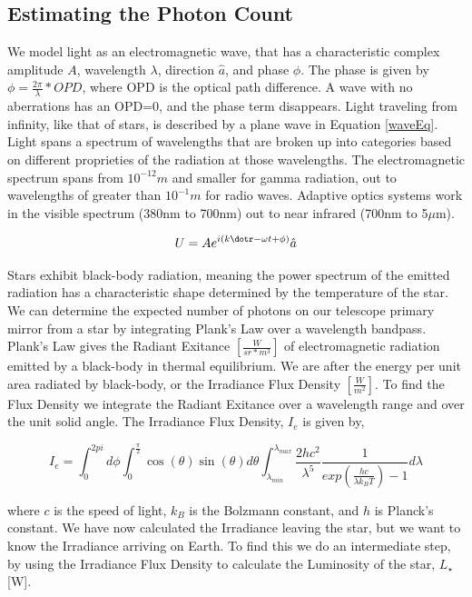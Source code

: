 \subsection{Estimating the Photon Count}

We model light as an electromagnetic wave, that has a characteristic complex amplitude $A$, wavelength $\lambda$, direction $\hat{a}$, and phase $\phi$. The phase is given by $\phi= \frac{2\pi}{\lambda}*OPD$, where OPD is the optical path difference. A wave with no aberrations has an OPD=0, and the phase term disappears. Light traveling from infinity, like that of stars, is described by a plane wave in Equation \ref{waveEq}. Light spans a spectrum of wavelengths that are broken up into categories based on different proprieties of the radiation at those wavelengths. The electromagnetic spectrum spans from $10^{-12} m$ and smaller for gamma radiation, out to wavelengths of greater than $10^{-1} m$ for radio waves. Adaptive optics systems work in the visible spectrum (380nm to 700nm) out to near infrared (700nm to 5$\mu$m). 

\begin{equation}
    U=Ae^{i(k\dotr-\omega t+ \phi)}\hat{a}
    \label{waveEq}
\end{equation}

Stars exhibit black-body radiation, meaning the power spectrum of the emitted radiation has a characteristic shape determined by the temperature of the star. We can determine the expected number of photons on our telescope primary mirror from a star by integrating Plank's Law over a wavelength bandpass. Plank's Law gives the Radiant Exitance $[\frac{W}{sr*m^3}]$ of electromagnetic radiation emitted by a black-body in thermal equilibrium. We are after the energy per unit area radiated by black-body, or the Irradiance Flux Density $[\frac{W}{m^2}]$. To find the Flux Density we integrate the Radiant Exitance over a wavelength range and over the unit solid angle. The Irradiance Flux Density, $I_e$ is given by,

\begin{equation}
    I_e=\int_{0}^{2pi} d\phi \int_{0}^{\frac{\pi}{2}} \cos(\theta)\sin(\theta)d\theta \int_{\lambda_{min}}^{\lambda_{max}} \frac{2hc^2}{\lambda^5}\frac{1}{exp(\frac{hc}{\lambda k_B T})-1} d\lambda
\end{equation}

where $c$ is the speed of light, $k_B$ is the Bolzmann constant, and $h$ is Planck's constant. We have now calculated the Irradiance leaving the star, but we want to know the Irradiance arriving on Earth. To find this we do an intermediate step, by using the Irradiance Flux Density to calculate the Luminosity of the star, $L_{\star}$ [W].

